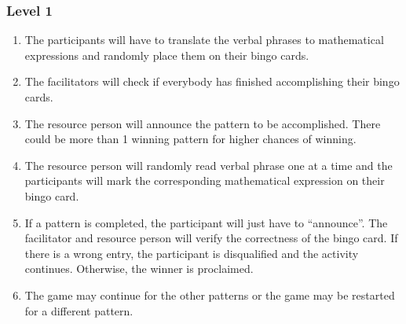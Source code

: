 \subsubsection*{Level 1}
\begin{enumerate}[Step 1.]
\item The participants will have to translate the verbal phrases to mathematical expressions and
randomly place them on their bingo cards.
\item The facilitators will check if everybody has finished accomplishing their bingo cards.
\item The resource person will announce the pattern to be accomplished. There could be more
than 1 winning pattern for higher chances of winning.
\item The resource person will randomly read verbal phrase one at a time and the participants will
mark the corresponding mathematical expression on their bingo card.
\item If a pattern is completed, the participant will just have to “announce”. The facilitator and
resource person will verify the correctness of the bingo card. If there is a wrong entry, the
participant is disqualified and the activity continues. Otherwise, the winner is proclaimed.
\item The game may continue for the other patterns or the game may be restarted for a different
pattern.
\end{enumerate}
